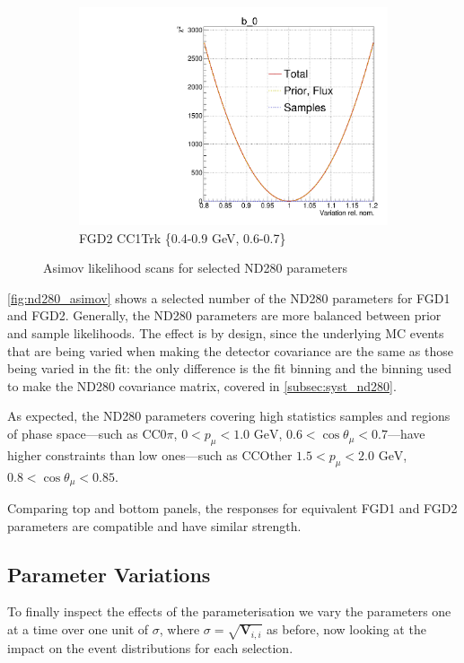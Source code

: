 \begin{figure}[!h]
\begin{subfigure}[t]{0.32\textwidth}
	\includegraphics[width=\textwidth, trim={0mm 0mm 0mm 11mm}, clip,page=542]{figures/mach3/Asimov/Full_LLHscan_18July_BeRPA_U_ND280logL_scan}
	\caption{FGD2 \numubar CC1Trk \{0.4-0.9 GeV, 0.6-0.7\}}
\end{subfigure}
\caption{Asimov likelihood scans for selected ND280 parameters}
\label{fig:nd280_asimov}
\end{figure}

\autoref{fig:nd280_asimov} shows a selected number of the ND280 parameters for FGD1 and FGD2. Generally, the ND280 parameters are more balanced between prior and sample likelihoods. The effect is by design, since the underlying MC events that are being varied when making the detector covariance are the same as those being varied in the fit: the only difference is the fit binning and the binning used to make the ND280 covariance matrix, covered in \autoref{subsec:syst_nd280}.

As expected, the ND280 parameters covering high statistics samples and regions of phase space---such as CC0$\pi$, $0<p_\mu<1.0\text{ GeV}$, $0.6 < \cos\theta_\mu < 0.7$---have higher constraints than low ones---such as CCOther $1.5 < p_\mu < 2.0\text{ GeV}$, $0.8 < \cos\theta_\mu < 0.85$.

Comparing top and bottom panels, the responses for equivalent FGD1 and FGD2 parameters are compatible and have similar strength.

\subsection{Parameter Variations}
\label{sec:sigmavar}
To finally inspect the effects of the parameterisation we vary the parameters one at a time over one unit of $\sigma$, where $\sigma = \sqrt{\mathbf{V}_{i,i}}$ as before, now looking at the impact on the event distributions for each selection.

